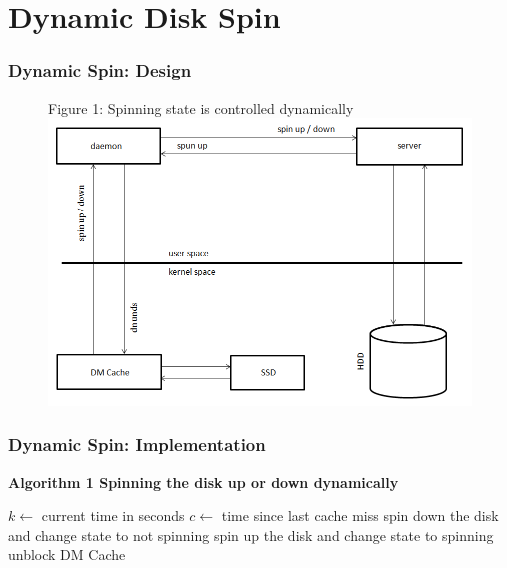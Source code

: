 \documentclass{beamer}
\begin{document}
\section{Dynamic Disk Spin}
%
\begin{frame}
	\frametitle{Dynamic Spin: Design}
	\begin{figure}
		Figure 1: Spinning state is controlled dynamically
		\centering \includegraphics[scale=.43]{drawing.png}
		\label{fig:struct}
	\end{figure}
\end{frame}
%
\algrenewcommand{}
\begin{frame}
	\frametitle{Dynamic Spin: Implementation}
	\bf Algorithm 1 \rm Spinning the disk up or down dynamically \\
	\begin{algorithmic}[1]
		\State $k\gets$ current time in seconds
		\State $c\gets$ time since last cache miss
		\State spin down the disk and change state to not spinning
		\EndIf
		\Else {}
		\State spin up the disk and change state to spinning
		\State unblock DM Cache
		\EndIf
		\EndIf
		\EndWhile
		\EndProcedure
	\end{algorithmic}
\end{frame}
%
\end{document}
